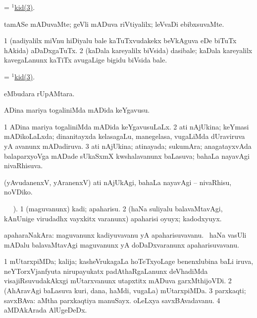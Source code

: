 \bentry
{}
\gl{\nA}
\bmng
= \hyperlink{kid(1)3}{$^1$kid(3)}. 
\emng
\eentry

\bentry
{}
\gl{\kirxvi}
\bmng
tamASe mADuvaMte; geVli mADuva riVtiyalilx; leVvaDi ebibxsuvaMte. 
\emng
\eentry

\bentry
{}
\gl{\nA}
\bmng
\bnum
\num{1} (nadiyalilx miVnu hiDiyalu bale kaTuTxvudakekx beVkAguva eDe biTuTx hAkida) aDaDxgaTuTx. 
\num{2} (kaDala kareyalilx biVsida) dasibale; kaDala kareyalilx kavegaLanunx kaTiTx avugaLige bigidu biVsida bale. 
\enum
\emng
\eentry

\bentry
{}
\gl{\nA}
\bmng
 = \hyperlink{kid(1)3}{$^1$kid(3)}. 
\emng
\eentry

\bentry
{}
\gl{\nA}
\bmng
{} eMbudara rUpAMtara. 
\emng
\eentry

\bentry
{}
\gl{\nA}
\bmng
ADina mariya togaliniMda mADida keYgavusu. 
\emng
\eentry

\bentry
{}
\gl{\gu}
\bmng
\bnum
\num{1} ADina mariya togaliniMda mADida keYgavusuLaLx. 
\num{2} ati nAjUkina; keYmasi mADikoLaLxda; dinanitayxda kelasagaLu, manegelasa, \mo vugaLiMda dUraviruva yA avanunx mADadiruva. 
\num{3} ati nAjUkina; atinayada; sukumAra; anagatayxvAda balaparxyoVga mADade sUkaSxmX kwshalavanunx baLasuva; bahaLa nayavAgi nivaRhisuva. 
\enum
\emng

\noindent
\gl{\nuga}
\bmng
{}  (yAvudanenxV, yAranenxV) ati nAjUkAgi, bahaLa nayavAgi -- nivaRhisu, noVDiko. 
\emng
\eentry

\bentry
{}
\gl{\sakirx}
\vakaq\  \ame\ ).\bmng
\bnum
\num{1} (maguvanunx) kadi; apaharisu. 
\num{2} (haNa suliyalu balavaMtavAgi, kAnUnige virudadhx vayxkitx \mo varanunx) apaharisi oyuyx; kadodxyuyx. 
\enum
\emng
\eentry

\bentry
{}
\gl{\nA}
\bmng
apaharaNakAra: 
\banum
{} maguvanunx kadiyuvavanu yA apaharisuvavanu. 
 \kanmu\ haNa vasUli mADalu balavaMtavAgi maguvanunx yA doDaDxvaranunx apaharisuvavanu. 
\eanum
\emng
\eentry

\bentry
{}
\gl{\nA}
\bmng
\bnum
\num{1} mUtarxpiMDa; kalija; kasheVrukagaLa hoTeTxyoLage benenxlubina baLi iruva, neYTorxVjanfyuta nirupayukatx padAthaRgaLanunx deVhadiMda visajiRsuvudakAkxgi mUtarxvanunx utapxtitx mADuva garxMthijoVDi.  
\num{2} (AhAravAgi baLasuva kuri, dana, haMdi, \mo vugaLa) mUtarxpiMDa. 
\num{3} parxkaqti; savxBAva:  aMtha parxkaqtiya manuSayx.  oLeLxya savxBAvadavanu. 
\hypertarget{kidney(4)}{} 
\num{4} aMDAkArada AlUgeDeDx. 
\enum
\emng


